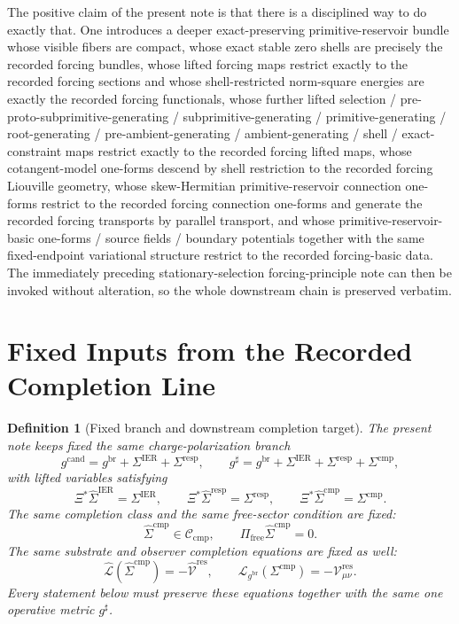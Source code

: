 \documentclass[11pt]{article}
\newcommand{\ObserverMap}{\Xi}
\newcommand{\ObserverMetric}{g^{\mathrm{br}}}
\newcommand{\CandidateMetric}{g^{\mathrm{cand}}}
\newcommand{\CompletedMetric}{g^{\sharp}}
\newcommand{\BaseShift}{\Sigma^{\mathrm{IER}}}
\newcommand{\ResponseShift}{\Sigma^{\mathrm{resp}}}
\newcommand{\CompShift}{\Sigma^{\mathrm{cmp}}}
\newcommand{\BaseLift}{\widehat\Sigma^{\mathrm{IER}}}
\newcommand{\ResponseLift}{\widehat\Sigma^{\mathrm{resp}}}
\newcommand{\CompLift}{\widehat\Sigma^{\mathrm{cmp}}}
\newcommand{\ResidualCore}{\mathcal V_{\mu\nu}^{\mathrm{res}}}
\newcommand{\ResidualLift}{\widehat{\mathcal V}^{\mathrm{res}}}
\newcommand{\SubReducedEin}{\widehat{\mathcal L}}
\newcommand{\FreeProj}{\Pi_{\mathrm{free}}}
\newcommand{\ReducedEin}{\mathcal L_{\ObserverMetric}}
\newcommand{\CompClass}{\mathscr C_{\mathrm{cmp}}}
\newtheorem{definition}{Definition}
\begin{document}
The positive claim of the present note is that there is a disciplined way to do exactly that. One introduces a deeper exact-preserving primitive-reservoir bundle whose visible fibers are compact, whose exact stable zero shells are precisely the recorded forcing bundles, whose lifted forcing maps restrict exactly to the recorded forcing sections and whose shell-restricted norm-square energies are exactly the recorded forcing functionals, whose further lifted selection / pre-proto-subprimitive-generating / subprimitive-generating / primitive-generating / root-generating / pre-ambient-generating / ambient-generating / shell / exact-constraint maps restrict exactly to the recorded forcing lifted maps, whose cotangent-model one-forms descend by shell restriction to the recorded forcing Liouville geometry, whose skew-Hermitian primitive-reservoir connection one-forms restrict to the recorded forcing connection one-forms and generate the recorded forcing transports by parallel transport, and whose primitive-reservoir-basic one-forms / source fields / boundary potentials together with the same fixed-endpoint variational structure restrict to the recorded forcing-basic data. The immediately preceding stationary-selection forcing-principle note can then be invoked without alteration, so the whole downstream chain is preserved verbatim.

\section{Fixed Inputs from the Recorded Completion Line}

\begin{definition}[Fixed branch and downstream completion target]
\label{def:fixed_branch}
The present note keeps fixed the same charge-polarization branch
\begin{equation}
\CandidateMetric
=
\ObserverMetric+\BaseShift+\ResponseShift,
\qquad
\CompletedMetric
=
\ObserverMetric+\BaseShift+\ResponseShift+\CompShift,
\label{eq:fixed_metrics}
\end{equation}
with lifted variables satisfying
\begin{equation}
\ObserverMap^*\BaseLift=\BaseShift,
\qquad
\ObserverMap^*\ResponseLift=\ResponseShift,
\qquad
\ObserverMap^*\CompLift=\CompShift.
\label{eq:fixed_lifts}
\end{equation}
The same completion class and the same free-sector condition are fixed:
\begin{equation}
\CompLift\in\CompClass,
\qquad
\FreeProj\CompLift=0.
\label{eq:fixed_free}
\end{equation}
The same substrate and observer completion equations are fixed as well:
\begin{equation}
\SubReducedEin(\CompLift)=-\ResidualLift,
\qquad
\ReducedEin(\CompShift)=-\ResidualCore.
\label{eq:fixed_solves}
\end{equation}
Every statement below must preserve these equations together with the same one operative metric \(\CompletedMetric\).
\end{definition}
\end{document}
